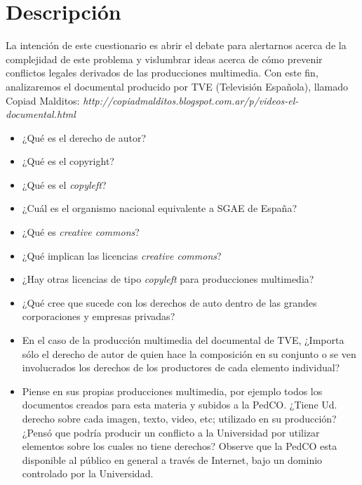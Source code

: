 \documentclass[12pt]{article}
\begin{document}
\section*{Descripción}


La intención de este cuestionario es abrir el debate para alertarnos acerca de
la complejidad de este problema y vislumbrar ideas acerca de cómo prevenir
conflictos legales derivados de las producciones multimedia. Con este fin,
analizaremos el documental producido por TVE (Televisión Española), llamado
Copiad Malditos:
\emph{http://copiadmalditos.blogspot.com.ar/p/videos-el-documental.html}

\begin{itemize}

    \item ¿Qué es el derecho de autor?
      
    \item ¿Qué es el copyright?
      
    \item ¿Qué es el \emph{copyleft}?
      
    \item ¿Cuál es el organismo nacional equivalente a SGAE de España?
      
    \item ¿Qué es \emph{creative commons}?
      
    \item ¿Qué implican las licencias \emph{creative commons}?
      
    \item ¿Hay otras licencias de tipo \emph{copyleft} para producciones
        multimedia?
      
    \item ¿Qué cree que sucede con los derechos de auto dentro de las grandes
        corporaciones y empresas privadas?
      
    \item En el caso de la producción multimedia del documental de TVE,
        ¿Importa sólo el derecho de autor de quien hace la composición en su
        conjunto o se ven involucrados los derechos de los productores de cada
        elemento individual?
      
    \item Piense en sus propias producciones multimedia, por ejemplo todos los
        documentos creados para esta materia y subidos a la PedCO. ¿Tiene Ud.
        derecho sobre cada imagen, texto, video, etc; utilizado en su
        producción? ¿Pensó que podría producir un conflicto a la Universidad
        por utilizar elementos sobre los cuales no tiene derechos? Observe que
        la PedCO esta disponible al público en general a través de Internet,
        bajo un dominio controlado por la Universidad.

\end{itemize}
\end{document}

